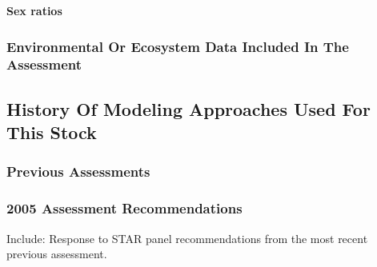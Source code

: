 \documentclass[12pt,]{article}
\begin{document}
\vspace{.5cm}

\textbf{Sex ratios}

\subsubsection{Environmental Or Ecosystem Data Included In The
Assessment}\label{environmental-or-ecosystem-data-included-in-the-assessment}

\subsection{History Of Modeling Approaches Used For This
Stock}\label{history-of-modeling-approaches-used-for-this-stock}

\subsubsection{Previous Assessments}\label{previous-assessments}

\subsubsection{2005 Assessment
Recommendations}\label{assessment-recommendations}

Include: Response to STAR panel recommendations from the most recent
previous assessment.
\end{document}

